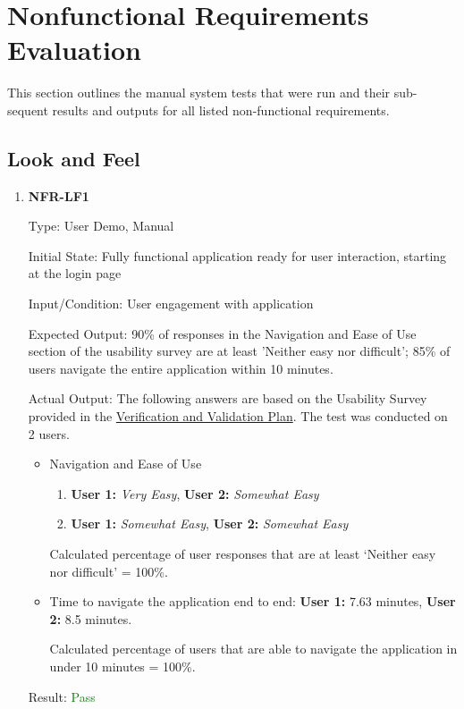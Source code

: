 \documentclass[12pt, titlepage]{article}
\begin{document}
\section{Nonfunctional Requirements Evaluation}
This section outlines the manual system tests that were run and their sub-
sequent results and outputs for all listed non-functional requirements.
\subsection{Look and Feel} \label{NFR-LF}
\begin{enumerate}
\item{\textbf{NFR-LF1}} \label{NFR:LF1}

Type: User Demo, Manual

Initial State: Fully functional application ready for user interaction, starting
at the login page

Input/Condition: User engagement with application

Expected Output: 90\% of responses in the Navigation and Ease of Use section of
the usability survey are at least 'Neither easy nor difficult'; 85\% of users
navigate the entire application within 10 minutes.

Actual Output: \newline
The following answers are based on the Usability Survey provided in the \href{https://github.com/SumanyaG/Alkalytics/blob/main/docs/VnVPlan/VnVPlan.pdf}
{Verification and Validation Plan}. The test was conducted on 2 users.
\begin{itemize}
  \item Navigation and Ease of Use
  \begin{enumerate}
    \item \textbf{User 1:} \emph{Very Easy}, \textbf{User 2:} \emph{Somewhat Easy}
    \item \textbf{User 1:} \emph{Somewhat Easy}, \textbf{User 2:} \emph{Somewhat Easy}
  \end{enumerate}
  Calculated percentage of user responses that are at least `Neither easy nor difficult' = 100\%.
  \item Time to navigate the application end to end: \textbf{User 1:} 7.63 minutes, \textbf{User 2:} 8.5 minutes.
  
  Calculated percentage of users that are able to navigate the application in under 10 minutes = 100\%.
\end{itemize}

Result: \textcolor{green}{Pass}


\end{enumerate}
\end{document}
